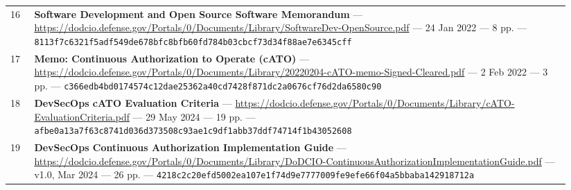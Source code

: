 \documentclass[11pt,letterpaper,twoside,openany]{memoir}
\begin{document}
{\begin{longtable}{@{}L{0.04\linewidth}L{0.90\linewidth}@{}}
16 & \textbf{Software Development and Open Source Software Memorandum} --- \url{https://dodcio.defense.gov/Portals/0/Documents/Library/SoftwareDev-OpenSource.pdf} --- 24 Jan 2022 --- 8 pp. --- \texttt{\scriptsize 8113f7c6321f5adf549de678bfc8bfb60fd784b03cbcf73d34f88ae7e6345cff}\\
17 & \textbf{Memo: Continuous Authorization to Operate (cATO)} --- \url{https://dodcio.defense.gov/Portals/0/Documents/Library/20220204-cATO-memo-Signed-Cleared.pdf} --- 2 Feb 2022 --- 3 pp. --- \texttt{\scriptsize c366edb4bd0174574c12dae25362a40cd7428f871dc2a0676cf76d2da6580c90}\\
18 & \textbf{DevSecOps cATO Evaluation Criteria} --- \url{https://dodcio.defense.gov/Portals/0/Documents/Library/cATO-EvaluationCriteria.pdf} --- 29 May 2024 --- 19 pp. --- \texttt{\scriptsize afbe0a13a7f63c8741d036d373508c93ae1c9df1abb37ddf74714f1b43052608}\\
19 & \textbf{DevSecOps Continuous Authorization Implementation Guide} --- \url{https://dodcio.defense.gov/Portals/0/Documents/Library/DoDCIO-ContinuousAuthorizationImplementationGuide.pdf} --- v1.0, Mar 2024 --- 26 pp. --- \texttt{\scriptsize 4218c2c20efd5002ea107e1f74d9e7777009fe9efe66f04a5bbaba142918712a}\\
\end{longtable}}
\end{document}
